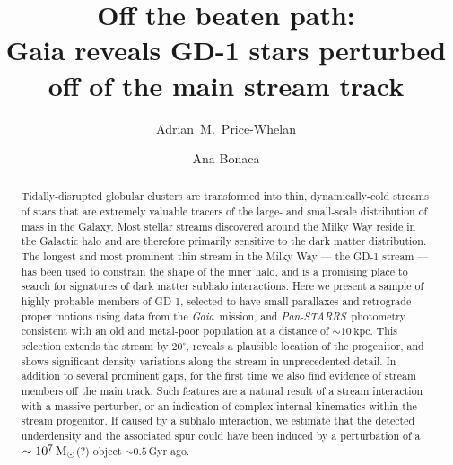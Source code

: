 \documentclass[modern]{aastex62}
\newcommand{\gaia}{\textsl{Gaia}}
\newcommand{\pans}{\textsl{Pan-STARRS}}
\newcommand{\kpc}{\textrm{kpc}}
\begin{document}
\sloppy\sloppypar\raggedbottom\frenchspacing %

\title{Off the beaten path: \\
       Gaia reveals GD-1 stars perturbed off of the main stream track}

\author[0000-0003-0872-7098]{Adrian~M.~Price-Whelan}

\author[0000-0002-7846-9787]{Ana Bonaca}

\begin{abstract}\noindent %
Tidally-disrupted globular clusters are transformed into thin, dynamically-cold
streams of stars that are extremely valuable tracers of the large- and
small-scale distribution of mass in the Galaxy.
Most stellar streams discovered around the Milky Way reside in the Galactic halo
and are therefore primarily sensitive to the dark matter distribution.
The longest and most prominent thin stream in the Milky Way --- the GD-1 stream --- has been used
to constrain the shape of the inner halo, and is a promising place to search for
signatures of dark matter subhalo interactions.
Here we present a sample of highly-probable members of GD-1, selected to have
small parallaxes and retrograde proper motions using data from the \gaia\
mission, and \pans\ photometry consistent with an old and metal-poor population
at a distance of $\sim10~\kpc$.
This selection extends the stream by $20^\circ$, reveals a plausible location of
the progenitor, and shows significant density variations along the stream in
unprecedented detail.
In addition to several prominent gaps, for the first time we also find evidence
of stream members off the main track.
Such features are a natural result of a stream interaction with a massive
perturber, or an indication of complex internal kinematics within the
stream progenitor.
If caused by a subhalo interaction, we estimate that the detected underdensity
and the associated spur could have been induced by a perturbation of a
$\sim10^7\,\rm M_\odot$(?) object $\sim 0.5\,$Gyr ago.
\end{abstract}
\end{document}
